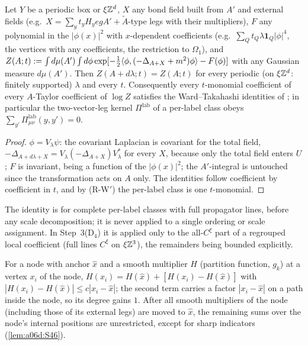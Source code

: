 \begin{lemma}\label{lem:a06d:S26}
Let $Y$ be a periodic box or $\xi\mathbb Z^d$, $X$ any bond field built from $A'$ and external fields (e.g.\ $X=\sum_yt_yH_yegA'+\tilde A$-type legs with their multipliers), $F$ any polynomial in the $|\phi(x)|^2$ with $x$-dependent coefficients (e.g.\ $\sum_Qt_Q\lambda\mathbf 1_Q|\phi|^4$, the \cite[(1.7)]{Ba3} vertices with any coefficients, the restriction to $\Omega_1$), and $Z(A;t):=\int d\mu(A')\int d\phi\exp[-\frac12\langle\phi,(-\Delta_{A+X}+m^2)\phi\rangle-F(\phi)]$ with any Gaussian measure $d\mu(A')$. Then $Z(A+d\lambda;t)=Z(A;t)$ for every periodic (on $\xi\mathbb Z^d$: finitely supported) $\lambda$ and every $t$. Consequently every $t$-monomial coefficient of every $A$-Taylor coefficient of $\log Z$ satisfies the Ward--Takahashi identities of \cite[pp.~430--431]{Ba3}; in particular the two-vector-leg kernel $\Pi^{\mathrm{lab}}$ of a per-label class obeys $\sum_{y'}\Pi^{\mathrm{lab}}_{\mu\nu}(y,y')=0$.
\end{lemma}

\begin{proof}
$\phi=V_\lambda\psi$: the covariant Laplacian is covariant for the total field, $-\Delta_{A+d\lambda+X}=V_\lambda(-\Delta_{A+X})V_\lambda^*$ for every $X$, because only the total field enters $U$; $F$ is invariant, being a function of the $|\phi(x)|^2$; the $A'$-integral is untouched since the transformation acts on $A$ only. The identities follow coefficient by coefficient in $t$, and by (R-W$'$) the per-label class is one $t$-monomial.
\end{proof}

The identity is for complete per-label classes with full propagator lines, before any scale decomposition; it is never applied to a single ordering or scale assignment. In Step~3(D$_4$) it is applied only to the all-$C^\xi$ part of a regrouped local coefficient (full lines $C^\xi$ on $\xi\mathbb Z^3$), the remainders being bounded explicitly.

\begin{lemma}\label{lem:a06d:S27}
For a node with anchor $\hat x$ and a smooth multiplier $H$ (partition function, $g_k$) at a vertex $x_i$ of the node, $H(x_i)=H(\hat x)+[H(x_i)-H(\hat x)]$ with $|H(x_i)-H(\hat x)|\le c|x_i-\hat x|$; the second term carries a factor $|x_i-\hat x|$ on a path inside the node, so its degree gains $1$. After all smooth multipliers of the node (including those of its external legs) are moved to $\hat x$, the remaining sums over the node's internal positions are unrestricted, except for sharp indicators (\cref{lem:a06d:S46}).
\end{lemma}

